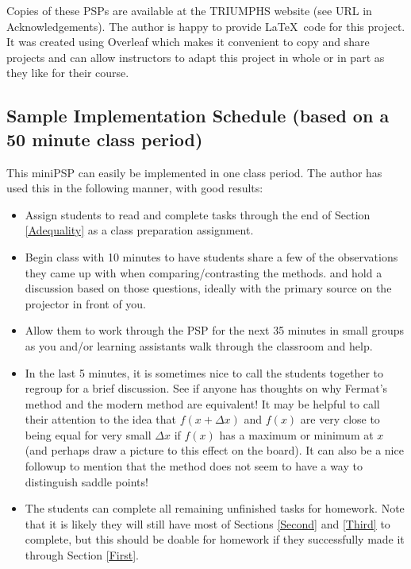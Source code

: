 \documentclass[11pt]{article}
\begin{document}
 Copies of these PSPs are available at the TRIUMPHS website (see URL in Acknowledgements).  
The author is happy to provide \LaTeX\ code for this project.  It was created using Overleaf which makes it convenient to copy and share projects and can allow instructors to adapt this project in whole or in part as they like for their course.


\subsection*{Sample Implementation Schedule (based on a 50 minute class period)}

This miniPSP can easily be implemented in one class period.  The author has used this in the following manner, with good results:

\begin{itemize}
    \item Assign students to read and complete tasks through the end of Section \ref{Adequality} as a class preparation assignment.
    \item Begin class with 10 minutes to have students share a few of the observations they came up with when comparing/contrasting the methods. and hold a discussion based on those questions, ideally with the primary source on the projector in front of you. 
    \item Allow them to work through the PSP for the next 35 minutes in small groups as you and/or learning assistants walk through the classroom and help.
    \item In the last 5 minutes, it is sometimes nice to call the students together to regroup for a brief discussion.  See if anyone has thoughts on why Fermat's method and the modern method are equivalent!  It may be helpful to call their attention to the idea that $f(x+\Delta x)$ and $f(x)$ are very close to being equal for very small $\Delta x$ if $f(x)$ has a maximum or minimum at $x$ (and perhaps draw a picture to this effect on the board).  It can also be a nice followup to mention that the method does not seem to have a way to distinguish saddle points!
    \item The students can complete all remaining unfinished tasks for homework.  Note that it is likely they will still have most of Sections \ref{Second} and \ref{Third} to complete, but this should be doable for homework if they successfully made it through Section \ref{First}.
\end{itemize}

 
\end{document}

